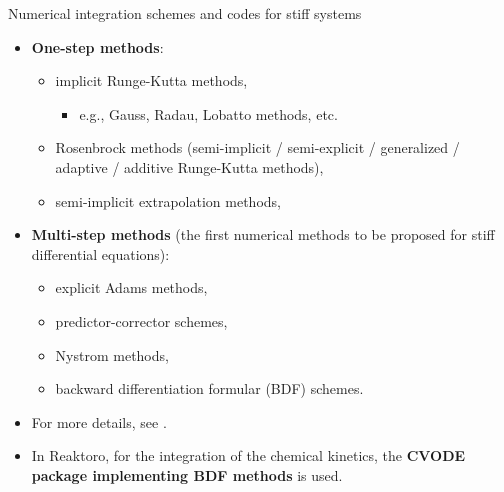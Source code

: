 %
%
\begin{frame}{Numerical integration schemes and codes for stiff systems}

\begin{itemize}

\item \alert{\bf One-step methods}:
%
\begin{itemize}
	\item implicit Runge-Kutta methods,
	\begin{itemize}
		\item e.g., Gauss, Radau, Lobatto methods, etc.
	\end{itemize}
	\item Rosenbrock methods (semi-implicit / semi-explicit / generalized / adaptive / additive Runge-Kutta methods),
	\item semi-implicit extrapolation methods, 
\end{itemize}
%
\item \alert{\bf Multi-step methods} (the first numerical methods to be proposed for stiff differential equations):
%
\begin{itemize}
	\item explicit Adams methods,
	\item predictor-corrector schemes,
	\item Nystrom methods, 
	\item backward differentiation formular (BDF) schemes.
\end{itemize}
%
\item For more details, see \cite{Hairer2010}.
%
\item In Reaktoro, for the integration of the chemical kinetics, the {\bf CVODE package implementing BDF methods} \cite{Cohen1996, Hindmarsh2005} is used. 
\end{itemize}

\end{frame}
